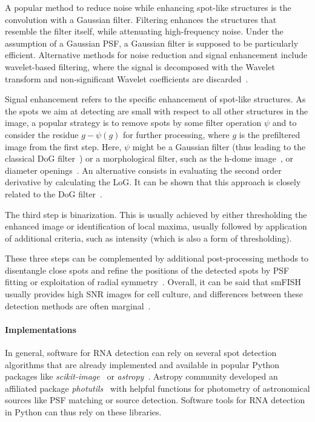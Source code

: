 A popular method to reduce noise while enhancing spot-like structures is the convolution with a Gaussian filter.
Filtering enhances the structures that resemble the filter itself, while attenuating high-frequency noise.
Under the assumption of a Gaussian \ac{PSF}, a Gaussian filter is supposed to be particularly efficient.
Alternative methods for noise reduction and signal enhancement include wavelet-based filtering, where the signal is decomposed with the Wavelet transform and non-significant Wavelet coefficients are discarded~\cite{Olivo-Marin2002}.

Signal enhancement refers to the specific enhancement of spot-like structures.
As the spots we aim at detecting are small with respect to all other structures in the image, a popular strategy is to remove spots by some filter operation $\psi$ and to consider the residue $g - \psi(g)$ for further processing, where $g$ is the prefiltered image from the first step.
Here, $\psi$ might be a Gaussian filter (thus leading to the classical \ac{DoG} filter~\cite{Lindeberg2015}) or a morphological filter, such as the h-dome image~\cite{smal_quantitative_2010}, or diameter openings~\cite{Walter2007}.
An alternative consists in evaluating the second order derivative by calculating the \ac{LoG}.
It can be shown that this approach is closely related to the \ac{DoG} filter~\cite{Lindeberg2015}.

The third step is binarization.
This is usually achieved by either thresholding the enhanced image or identification of local maxima, usually followed by application of additional criteria, such as intensity (which is also a form of thresholding).

These three steps can be complemented by additional post-processing methods to disentangle close spots and refine the positions of the detected spots by \ac{PSF} fitting or exploitation of radial symmetry~\cite{bahry_rs-fish_2021}.
Overall, it can be said that smFISH usually provides high \ac{SNR} images for cell culture, and differences between these detection methods are often marginal~\cite{smal_quantitative_2010}. 

\paragraph{Implementations}

In general, software for \ac{RNA} detection can rely on several spot detection algorithms that are already implemented and available in popular Python packages like \emph{scikit-image}~\cite{walt_scikit-image_2014} or \emph{astropy}~\cite{astropy_2018}.
Astropy community developed an affiliated package \emph{photutils}~\cite{larry_bradley_2020_4044744} with helpful functions for photometry of astronomical sources like \ac{PSF} matching or source detection.
Software tools for \ac{RNA} detection in Python can thus rely on these libraries.

